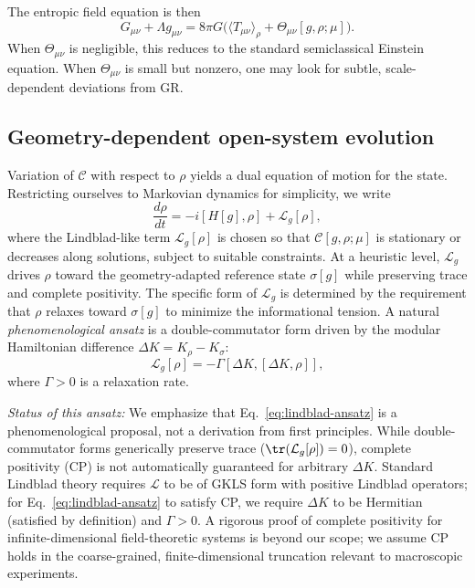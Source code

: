 \documentclass[aps,prd,twocolumn,superscriptaddress,nofootinbib,floatfix]{revtex4-2}
\newcommand{\Cfunc}{\mathcal{C}}
\newcommand{\sg}{\sigma[g]}
\newcommand{\Tmn}{\Theta_{\mu\nu}}
\begin{document}
The entropic field equation is then
\begin{equation}
    G_{\mu\nu} + \Lambda g_{\mu\nu}
    =
    8\pi G\big(
        \langle T_{\mu\nu}\rangle_\rho + \Tmn[g,\rho;\mu]
    \big).
    \label{eq:coherist-einstein}
\end{equation}
When $\Tmn$ is negligible, this reduces to the standard semiclassical Einstein equation.
When $\Tmn$ is small but nonzero, one may look for subtle, scale-dependent deviations from GR.

\subsection{Geometry-dependent open-system evolution}

Variation of $\Cfunc$ with respect to $\rho$ yields a dual equation of motion for the state.
Restricting ourselves to Markovian dynamics for simplicity, we write
\begin{equation}
    \frac{d\rho}{dt}
    =
    -i[H[g],\rho] + \mathcal{L}_g[\rho],
    \label{eq:rho-eom}
\end{equation}
where the Lindblad-like term $\mathcal{L}_g[\rho]$ is chosen so that $\Cfunc[g,\rho;\mu]$ is stationary or decreases along solutions, subject to suitable constraints.
At a heuristic level, $\mathcal{L}_g$ drives $\rho$ toward the geometry-adapted reference state $\sg$ while preserving trace and complete positivity.
The specific form of $\mathcal{L}_g$ is determined by the requirement that $\rho$ relaxes toward $\sigma[g]$ to minimize the informational tension.
A natural \emph{phenomenological ansatz} is a double-commutator form driven by the modular Hamiltonian difference $\Delta K = K_\rho - K_\sigma$:
\begin{equation}
    \mathcal{L}_g[\rho] = -\Gamma [ \Delta K, [ \Delta K, \rho ] ],
    \label{eq:lindblad-ansatz}
\end{equation}
where $\Gamma > 0$ is a relaxation rate.

\emph{Status of this ansatz:} We emphasize that Eq.~\eqref{eq:lindblad-ansatz} is a phenomenological proposal, not a derivation from first principles. While double-commutator forms generically preserve trace ($\tr(\mathcal{L}_g[\rho]) = 0$), complete positivity (CP) is not automatically guaranteed for arbitrary $\Delta K$. Standard Lindblad theory requires $\mathcal{L}$ to be of GKLS form with positive Lindblad operators; for Eq.~\eqref{eq:lindblad-ansatz} to satisfy CP, we require $\Delta K$ to be Hermitian (satisfied by definition) and $\Gamma > 0$. A rigorous proof of complete positivity for infinite-dimensional field-theoretic systems is beyond our scope; we assume CP holds in the coarse-grained, finite-dimensional truncation relevant to macroscopic experiments.
\end{document}
